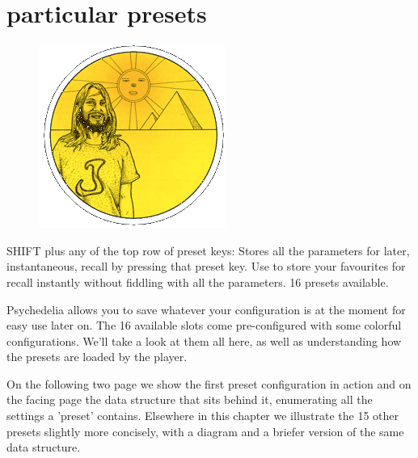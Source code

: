 \chapter{particular presets} 
\label{sec:presets}
\lstset{style=6502Style}
\lstset{ 
   aboveskip=5pt,
   belowskip=0pt,
}

\begin{definition}
\setlength{\intextsep}{0pt}%
\setlength{\columnsep}{3pt}%
\begin{figure}
\includegraphics[width=\linewidth]{src/callout/psych.png} 
\end{figure}
\small
SHIFT plus any of the top row of
preset keys: Stores all the parameters for later, instantaneous,
recall by pressing that preset key. Use to store your favourites for
recall instantly without fiddling with all the parameters. 16 presets
available.
\end{definition}

Psychedelia allows you to save whatever your configuration is at the moment for easy use later on.
The 16 available slots come pre-configured with some colorful configurations. We'll take a look at them
all here, as well as understanding how the presets are loaded by the player.

On the following two page we show the first preset configuration in action and on the facing page the 
data structure that sits behind it, enumerating all the settings a 'preset' contains. Elsewhere in this
chapter we illustrate the 15 other presets slightly more concisely, with a diagram and a briefer version
of the same data structure.

